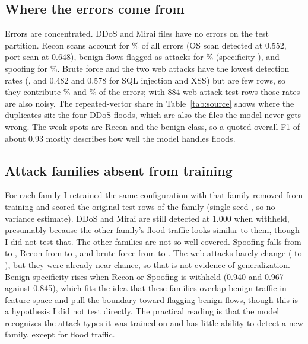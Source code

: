 \documentclass[conference]{IEEEtran}
\begin{document}
\subsection{Where the errors come from}
Errors are concentrated. DDoS and Mirai files have no errors on the test partition. Recon scans account for \FamReconErr\% of all errors (OS scan detected at 0.552, port scan at 0.648), benign flows flagged as attacks for \FamBenignErr\% (specificity \FamBenignRate{}), and spoofing for \FamSpoofingErr\%. Brute force and the two web attacks have the lowest detection rates (\FamBruteForceRate{}, and 0.482 and 0.578 for SQL injection and XSS) but are few rows, so they contribute \FamBruteForceErr\% and \FamWebbasedErr\% of the errors; with 884 web-attack test rows those rates are also noisy. The repeated-vector share in Table~\ref{tab:source} shows where the duplicates sit: the four DDoS floods, which are also the files the model never gets wrong. The weak spots are Recon and the benign class, so a quoted overall F1 of about 0.93 mostly describes how well the model handles floods.
\tabSource

\subsection{Attack families absent from training}
For each family I retrained the same configuration with that family removed from training and scored the original test rows of the family (single seed \ConfigSeed{}, so no variance estimate). DDoS and Mirai are still detected at 1.000 when withheld, presumably because the other family's flood traffic looks similar to them, though I did not test that. The other families are not so well covered. Spoofing falls from \HoldSpoofingSeen{} to \HoldSpoofingOut, Recon from \HoldReconSeen{} to \HoldReconOut, and brute force from \HoldBruteForceSeen{} to \HoldBruteForceOut. The web attacks barely change (\HoldWebbasedSeen{} to \HoldWebbasedOut), but they were already near chance, so that is not evidence of generalization. Benign specificity rises when Recon or Spoofing is withheld (0.940 and 0.967 against 0.845), which fits the idea that these families overlap benign traffic in feature space and pull the boundary toward flagging benign flows, though this is a hypothesis I did not test directly. The practical reading is that the model recognizes the attack types it was trained on and has little ability to detect a new family, except for flood traffic.
\tabHoldout
\end{document}
